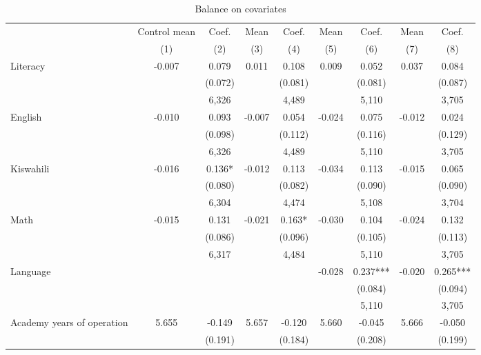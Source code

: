 \begin{table}[htbp]
  \centering
  \small
  \caption{Balance on covariates}
  \begin{threeparttable}
    \begin{tabular}{lcccccccc}
    \toprule
    \toprule
          & Control mean & Coef. & Mean  & Coef. & Mean  & Coef. & Mean  & Coef. \\
          & (1)   & (2)   & (3)   & (4)   & (5)   & (6)   & (7)   & (8) \\
    \midrule
    Literacy & -0.007 & 0.079 & 0.011 & 0.108 & 0.009 & 0.052 & 0.037 & 0.084 \\
          &       & (0.072) &       & (0.081) &       & (0.081) &       & (0.087) \\
          &       & 6,326 &       & 4,489 &       & 5,110 &       & 3,705 \\
    English & -0.010 & 0.093 & -0.007 & 0.054 & -0.024 & 0.075 & -0.012 & 0.024 \\
          &       & (0.098) &       & (0.112) &       & (0.116) &       & (0.129) \\
          &       & 6,326 &       & 4,489 &       & 5,110 &       & 3,705 \\
    Kiswahili & -0.016 & 0.136* & -0.012 & 0.113 & -0.034 & 0.113 & -0.015 & 0.065 \\
          &       & (0.080) &       & (0.082) &       & (0.090) &       & (0.090) \\
          &       & 6,304 &       & 4,474 &       & 5,108 &       & 3,704 \\
    Math  & -0.015 & 0.131 & -0.021 & 0.163* & -0.030 & 0.104 & -0.024 & 0.132 \\
          &       & (0.086) &       & (0.096) &       & (0.105) &       & (0.113) \\
          &       & 6,317 &       & 4,484 &       & 5,110 &       & 3,705 \\
    Language &       &       &       &       & -0.028 & 0.237*** & -0.020 & 0.265*** \\
          &       &       &       &       &       & (0.084) &       & (0.094) \\
          &       &       &       &       &       & 5,110 &       & 3,705 \\
    Academy years of operation & 5.655 & -0.149 & 5.657 & -0.120 & 5.660 & -0.045 & 5.666 & -0.050 \\
          &       & (0.191) &       & (0.184) &       & (0.208) &       & (0.199) \\

\end{tabular}
\end{threeparttable}
\end{table}
